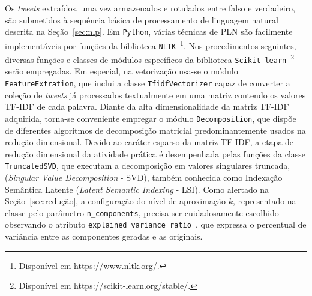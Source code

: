 \documentclass{SBCbookchapter}
\begin{document}
Os \textit{tweets} extraídos, uma vez armazenados e rotulados entre falso e verdadeiro, são submetidos à sequência básica de processamento de linguagem natural descrita na Seção~\ref{sec:nlp}. Em \texttt{Python}, várias técnicas de PLN são facilmente implementáveis por funções da biblioteca \texttt{NLTK}~\footnote{Disponível em https://www.nltk.org/.}. Nos procedimentos seguintes, diversas funções e classes de módulos específicos da biblioteca \texttt{Scikit-learn}~\footnote{Disponível em https://scikit-learn.org/stable/.} serão empregadas. Em especial, na vetorização usa-se o módulo \texttt{FeatureExtration}, que inclui a classe \texttt{TfidfVectorizer} capaz de converter a coleção de \textit{tweets} já processados textualmente em uma matriz contendo os valores TF-IDF de cada palavra. Diante da alta dimensionalidade da matriz TF-IDF adquirida, torna-se conveniente empregar o módulo \texttt{Decomposition}, que dispõe de diferentes algoritmos de decomposição matricial predominantemente usados na redução dimensional. Devido ao  caráter esparso da matriz TF-IDF, a etapa de redução dimensional da atividade prática é desempenhada pelas funções da classe \texttt{TruncatedSVD}, que executam a decomposição em valores singulares truncada, 
(\textit{Singular Value Decomposition} - SVD), também conhecida como Indexação Semântica Latente (\textit{Latent Semantic Indexing} - LSI). Como alertado na Seção~\ref{sec:redução}, a configuração do nível de aproximação $k$, representado na classe pelo parâmetro \texttt{n\_components}, precisa ser cuidadosamente escolhido observando o atributo \texttt{explained\_variance\_ratio\_}, que expressa o percentual de variância entre as componentes geradas e as originais.
 
\end{document}
